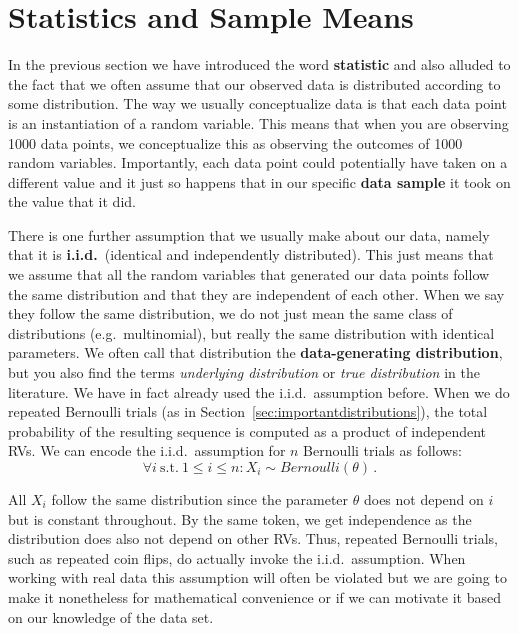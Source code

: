 \section{Statistics and Sample Means}

In the previous section we have introduced the word \textbf{statistic} and also alluded to the fact that we often assume that our
observed data is distributed according to some distribution. The way we usually conceptualize data is that each data point is
an instantiation of a random variable. This means that when you are observing 1000 data points, we conceptualize this as observing
the outcomes of 1000 random variables. Importantly, each data point could potentially have taken on a different value and it just 
so happens that in our specific \textbf{data sample} it took on the value that it did. 

There is one further assumption that we usually make about our data, namely that it is \textbf{i.i.d.}\ (identical and independently
distributed). This just means that we assume that all the random variables that generated our data points follow the same distribution and 
that they are independent of each other. When we say they follow the same distribution, we do not just mean the same class of
distributions (e.g.\ multinomial), but really the same distribution with identical parameters. We often
call that distribution the \textbf{data-generating distribution}, but you also find the terms 
\textit{underlying distribution} or \textit{true distribution} in the literature. 
We have in fact already used the i.i.d.\ assumption before. When we do repeated Bernoulli trials (as in Section~\ref{sec:importantdistributions}), the total probability of the resulting sequence is computed as a product
of independent RVs. We can encode the i.i.d.\ assumption for $ n $ Bernoulli trials as follows:
\begin{equation}
\forall i \ \mbox{s.t.} \  1 \leq i \leq n : X_{i} \sim Bernoulli(\theta) \, .
\end{equation}

All $ X_{i} $ follow the same distribution since the parameter $ \theta $ does not depend on $ i $ but is constant throughout.
By the same token, we get independence as the distribution does also not depend on other RVs. Thus, repeated Bernoulli trials,
such as repeated coin flips, do actually invoke the i.i.d.\ assumption. When working with real data this assumption will often be
violated but we are going to make it nonetheless for mathematical convenience or if we can motivate it
based on our knowledge of the data set.

